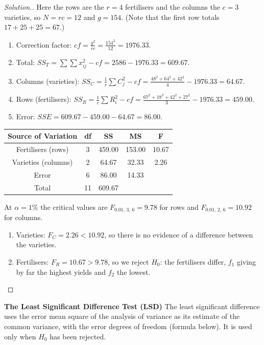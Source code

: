 \documentclass[11pt,a4paper]{article}
\theoremstyle{definition}
\newenvironment{solution}
  {\renewcommand{\qedsymbol}{}\begin{proof}[\textit{Solution}.]}
  {\end{proof}}
\begin{document}
\begin{solution}
Here the rows are the $r = 4$ fertilisers and the columns the $c = 3$ varieties, so
$N = rc = 12$ and $g = 154$. (Note that the first row totals $17 + 25 + 25 = 67$.)
\begin{enumerate}
\item Correction factor: $cf = \frac{g^2}{rc} = \frac{154^2}{12} = 1976.33$.
\item Total: $SS_T = \sum\sum x_{ij}^2 - cf = 2586 - 1976.33 = 609.67$.
\item Columns (varieties): $SS_C = \frac{1}{r}\sum C_j^2 - cf = \frac{48^2 + 64^2 + 42^2}{4} - 1976.33 = 64.67$.
\item Rows (fertilisers): $SS_R = \frac{1}{c}\sum R_i^2 - cf = \frac{67^2 + 18^2 + 42^2 + 27^2}{3} - 1976.33 = 459.00$.
\item Error: $SSE = 609.67 - 459.00 - 64.67 = 86.00$.
\end{enumerate}
\begin{table}[H]
\centering
\begin{tabular}{|c|c|c|c|c|}
\hline
Source of Variation & df & SS & MS & F\\
\hline
Fertilisers (rows) & 3 & 459.00 & 153.00 & 10.67\\
Varieties (columns) & 2 & 64.67 & 32.33 & 2.26\\
Error & 6 & 86.00 & 14.33 &\\
\hline
Total & 11 & 609.67 &&\\
\hline
\end{tabular}
\end{table}
At $\alpha = 1\%$ the critical values are $F_{0.01,\,3,\,6} = 9.78$ for rows and
$F_{0.01,\,2,\,6} = 10.92$ for columns.
\begin{enumerate}
\item[(a)] Varieties: $F_C = 2.26<10.92$, so there is no evidence of a difference between the varieties.
\item[(b)] Fertilisers: $F_R = 10.67>9.78$, so we reject $H_0$: the fertilisers differ, $f_1$
giving by far the highest yields and $f_2$ the lowest.
\end{enumerate}
\end{solution}



\textbf{The Least Significant Difference Test (LSD)}
The least significant difference uses the error mean square of the analysis of variance as its estimate of the common variance, with the error degrees of freedom (formula below). It is used only when $H_0$ has been rejected.
\end{document}
